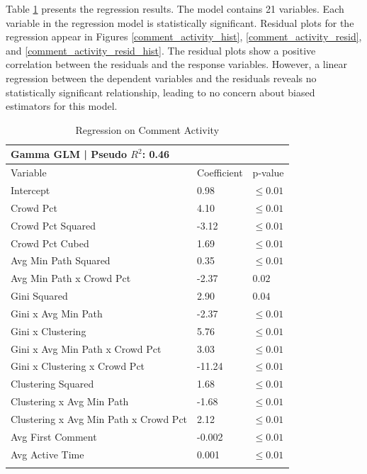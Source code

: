 Table \ref{comment_activity_regression} presents the regression results. The model contains 21 variables. Each variable in the regression model is statistically significant. Residual plots for the regression appear in Figures \ref{comment_activity_hist}, \ref{comment_activity_resid}, and \ref{comment_activity_resid_hist}. The residual plots show a positive correlation between the residuals and the response variables. However, a linear regression between the dependent variables and the residuals reveals no statistically significant relationship, leading to no concern about biased estimators for this model.

\begin{table}
\caption{Regression on Comment Activity}
\label{comment_activity_regression}
\begin{tabular}{lll}
Gamma GLM | Pseudo $R^2$: 0.46 \\
\hline\noalign{\smallskip}
Variable & Coefficient & p-value  \\
\noalign{\smallskip}\hline\noalign{\smallskip}
Intercept & 0.98 & $\leq 0.01$ \\
Crowd Pct & 4.10 & $\leq 0.01$ \\
Crowd Pct Squared & -3.12 & $\leq 0.01$ \\
Crowd Pct Cubed & 1.69 & $\leq 0.01$ \\
Avg Min Path Squared & 0.35 & $\leq 0.01$ \\
Avg Min Path x Crowd Pct &  -2.37 & $0.02$ \\
Gini Squared & 2.90 & $0.04$ \\
Gini x Avg Min Path & -2.37 & $\leq 0.01$ \\
Gini x Clustering & 5.76 & $\leq 0.01$ \\
Gini x Avg Min Path x Crowd Pct & 3.03 & $\leq 0.01$ \\
Gini x Clustering  x Crowd Pct & -11.24 & $\leq 0.01$ \\
Clustering Squared & 1.68 & $\leq 0.01$ \\
Clustering x Avg Min Path & -1.68 & $\leq 0.01$ \\
Clustering x Avg Min Path x Crowd Pct & 2.12 & $\leq 0.01$ \\
Avg First Comment & -0.002 & $\leq 0.01$ \\
Avg Active Time & 0.001 & $\leq 0.01$ \\
\noalign{\smallskip}\hline
\end{tabular}
\end{table}

